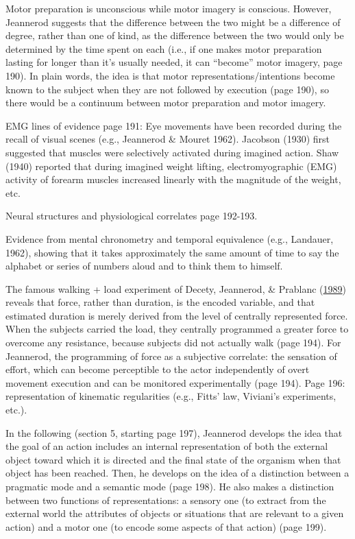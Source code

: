 \documentclass[a4paper,12pt,twoside,openright,oldfontcommands]{memoir}
\begin{document}
Motor preparation is unconscious while motor imagery is conscious.
However, Jeannerod suggests that the difference between the two might be
a difference of degree, rather than one of kind, as the difference
between the two would only be determined by the time spent on each
(i.e., if one makes motor preparation lasting for longer than it's
usually needed, it can ``become'' motor imagery, page 190). In plain
words, the idea is that motor representations/intentions become known to
the subject when they are not followed by execution (page 190), so there
would be a continuum between motor preparation and motor imagery.

EMG lines of evidence page 191: Eye movements have been recorded during
the recall of visual scenes (e.g., Jeannerod \& Mouret 1962). Jacobson
(1930) first suggested that muscles were selectively activated during
imagined action. Shaw (1940) reported that during imagined weight
lifting, electromyographic (EMG) activity of forearm muscles increased
linearly with the magnitude of the weight, etc.

Neural structures and physiological correlates page 192-193.

Evidence from mental chronometry and temporal equivalence (e.g.,
Landauer, 1962), showing that it takes approximately the same amount of
time to say the alphabet or series of numbers aloud and to think them to
himself.

The famous walking + load experiment of Decety, Jeannerod, \& Prablanc
(\protect\hyperlink{ref-decety_timing_1989}{1989}) reveals that force,
rather than duration, is the encoded variable, and that estimated
duration is merely derived from the level of centrally represented
force. When the subjects carried the load, they centrally programmed a
greater force to overcome any resistance, because subjects did not
actually walk (page 194). For Jeannerod, the programming of force as a
subjective correlate: the sensation of effort, which can become
perceptible to the actor independently of overt movement execution and
can be monitored experimentally (page 194). Page 196: representation of
kinematic regularities (e.g., Fitts' law, Viviani's experiments, etc.).

In the following (section 5, starting page 197), Jeannerod develops the
idea that the goal of an action includes an internal representation of
both the external object toward which it is directed and the final state
of the organism when that object has been reached. Then, he develops on
the idea of a distinction between a pragmatic mode and a semantic mode
(page 198). He also makes a distinction between two functions of
representations: a sensory one (to extract from the external world the
attributes of objects or situations that are relevant to a given action)
and a motor one (to encode some aspects of that action) (page 199).
\end{document}
